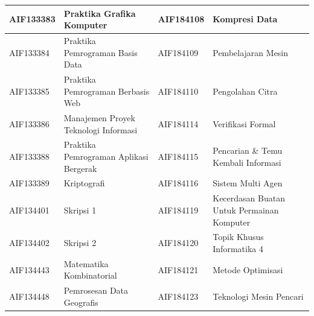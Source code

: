 \begin{enumerate}
\begin{table}[H]
\begin{tabular}{|p{3.25cm}|p{4.25cm}|p{3.25cm}|p{4.25cm}|}
AIF133383 & Praktika Grafika Komputer & AIF184108 & Kompresi Data \\ \hline
AIF133384 & Praktika Pemrograman Basis Data & AIF184109 & Pembelajaran Mesin \\ \hline
AIF133385 & Praktika Pemrograman Berbasis Web & AIF184110 & Pengolahan Citra \\ \hline
AIF133386 & Manajemen Proyek Teknologi Informasi & AIF184114 & Verifikasi Formal \\ \hline
AIF133388 & Praktika Pemrograman Aplikasi Bergerak & AIF184115 & Pencarian \& Temu Kembali Informasi \\ \hline
AIF133389 & Kriptografi & AIF184116 & Sistem Multi Agen \\ \hline
AIF134401 & Skripsi 1 & AIF184119 & Kecerdasan Buatan Untuk Permainan Komputer \\ \hline
AIF134402 & Skripsi 2 & AIF184120 & Topik Khusus Informatika 4 \\ \hline
AIF134443 & Matematika Kombinatorial & AIF184121 & Metode Optimisasi \\ \hline
AIF134448 & Pemrosesan Data Geografis & AIF184123 & Teknologi Mesin Pencari \\ \hline
\end{tabular}
\end{table}


\end{enumerate}
